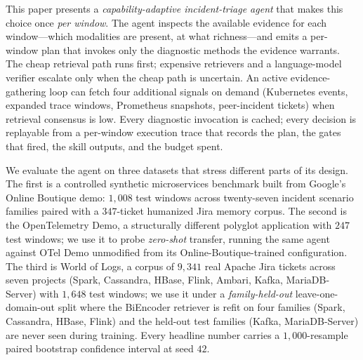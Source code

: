 This paper presents a \emph{capability-adaptive incident-triage agent} that makes this choice once \emph{per window}. The agent inspects the available evidence for each window---which modalities are present, at what richness---and emits a per-window plan that invokes only the diagnostic methods the evidence warrants. The cheap retrieval path runs first; expensive retrievers and a language-model verifier escalate only when the cheap path is uncertain. An active evidence-gathering loop can fetch four additional signals on demand (Kubernetes events, expanded trace windows, Prometheus snapshots, peer-incident tickets) when retrieval consensus is low. Every diagnostic invocation is cached; every decision is replayable from a per-window execution trace that records the plan, the gates that fired, the skill outputs, and the budget spent.

We evaluate the agent on three datasets that stress different parts of its design. The first is a controlled synthetic microservices benchmark built from Google's Online Boutique demo: $1{,}008$ test windows across twenty-seven incident scenario families paired with a $347$-ticket humanized Jira memory corpus. The second is the OpenTelemetry Demo, a structurally different polyglot application with $247$ test windows; we use it to probe \emph{zero-shot} transfer, running the same agent against OTel Demo unmodified from its Online-Boutique-trained configuration. The third is World of Logs, a corpus of $9{,}341$ real Apache Jira tickets across seven projects (Spark, Cassandra, HBase, Flink, Ambari, Kafka, MariaDB-Server) with $1{,}648$ test windows; we use it under a \emph{family-held-out} leave-one-domain-out split where the BiEncoder retriever is refit on four families (Spark, Cassandra, HBase, Flink) and the held-out test families (Kafka, MariaDB-Server) are never seen during training. Every headline number carries a $1{,}000$-resample paired bootstrap confidence interval at seed $42$.

